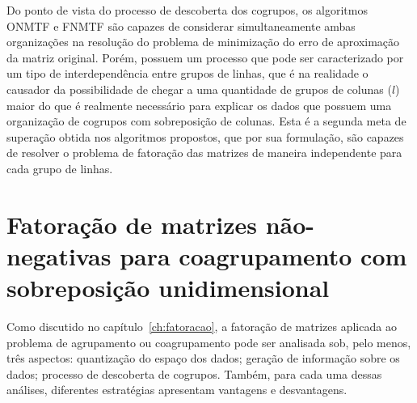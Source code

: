 \documentclass[
    12pt,                %
    oneside,            %
    a4paper,            %
    english,            %
    brazil                %
    ]{abntex2ppgsi}
\begin{document}
Do ponto de vista do processo de descoberta dos cogrupos, os algoritmos ONMTF e FNMTF são capazes de considerar simultaneamente ambas organizações na resolução do problema de minimização do erro de aproximação da matriz original.
Porém, possuem um processo que pode ser caracterizado por um tipo de interdependência entre grupos de linhas, que é na realidade o causador da possibilidade de chegar a uma quantidade de grupos de colunas ($l$) maior do que é realmente necessário para explicar os dados que possuem uma organização de cogrupos com sobreposição de colunas.
Esta é a segunda meta de superação obtida nos algoritmos propostos, que por sua formulação, são capazes de resolver o problema de fatoração das matrizes de maneira independente para cada grupo de linhas.




\chapter{Fatoração de matrizes não-negativas para coagrupamento com sobreposição unidimensional}
\label{ch:proposedalgs}

Como discutido no capítulo~\ref{ch:fatoracao}, a fatoração de matrizes aplicada ao problema de agrupamento ou coagrupamento pode ser analisada sob, pelo menos, três aspectos: quantização do espaço dos dados; geração de informação sobre os dados; processo de descoberta de cogrupos.
Também, para cada uma dessas análises, diferentes estratégias apresentam vantagens e desvantagens.
\end{document}
